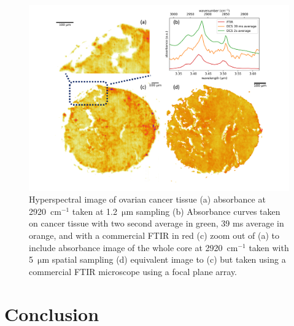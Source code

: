 \documentclass{optica-article}
\begin{document}
\begin{figure}[H]
    \centering
    \includegraphics[width=\linewidth]{bio_image_w_FTIR_comparison.png}
    \caption{Hyperspectral image of ovarian cancer tissue (a) absorbance at \mbox{2920 $\mathrm{cm^{-1}}$} taken at \mbox{1.2 $\mathrm{\mu m}$} sampling (b) Absorbance curves taken on cancer tissue with two second average in green, 39 ms average in orange, and with a commercial FTIR in red (c) zoom out of (a) to include absorbance image of the whole core at \mbox{2920 $\mathrm{cm^{-1}}$} taken with \mbox{5 $\mathrm{\mu m}$} spatial sampling (d) equivalent image to (c) but taken using a commercial FTIR microscope using a focal plane array.}
    \label{fig:bio}
\end{figure}

\section{Conclusion}
\end{document}
